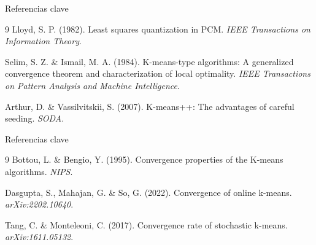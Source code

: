 \documentclass[aspectratio=169]{beamer}
\begin{document}
\begin{frame}{Referencias clave}
    \begin{thebibliography}{9}
         Lloyd, S. P. (1982). Least squares quantization in PCM. \textit{IEEE Transactions on Information Theory}.
        
         Selim, S. Z. \& Ismail, M. A. (1984). K-means-type algorithms: A generalized convergence theorem and characterization of local optimality. \textit{IEEE Transactions on Pattern Analysis and Machine Intelligence}.
        
         Arthur, D. \& Vassilvitskii, S. (2007). K-means++: The advantages of careful seeding. \textit{SODA}.
    \end{thebibliography}
\end{frame}

\begin{frame}{Referencias clave}
    \begin{thebibliography}{9}
         Bottou, L. \& Bengio, Y. (1995). Convergence properties of the K-means algorithms. \textit{NIPS}.
        
         Dasgupta, S., Mahajan, G. \& So, G. (2022). Convergence of online k-means. \textit{arXiv:2202.10640}.
        
         Tang, C. \& Monteleoni, C. (2017). Convergence rate of stochastic k-means. \textit{arXiv:1611.05132}.
    \end{thebibliography}
\end{frame}
\end{document}
